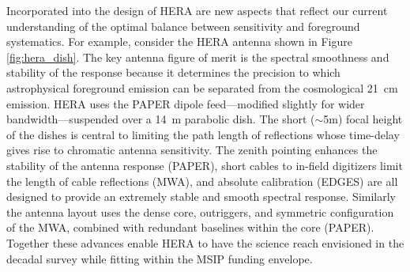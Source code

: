 \documentclass[preprint]{aastex}
\begin{document}
Incorporated into the design of HERA are new aspects that reflect our current understanding of the optimal balance between sensitivity and foreground systematics.  
For example, consider the HERA antenna shown in Figure \ref{fig:hera_dish}. The key antenna figure of merit is the spectral smoothness and stability of the response because it determines the precision to which astrophysical foreground emission can be separated from the cosmological 21~cm emission. HERA uses the PAPER dipole feed---modified slightly for wider bandwidth---suspended over a 14~m parabolic dish. The short ($\sim$5m) focal height of the dishes is central to limiting the path length of reflections whose time-delay gives rise to chromatic antenna sensitivity. The zenith pointing enhances the stability of the antenna response (PAPER), short cables to in-field digitizers limit the length of cable reflections (MWA), and absolute calibration (EDGES) are all designed to provide an extremely stable and smooth spectral response. Similarly the antenna layout uses the dense core, outriggers, and symmetric configuration of the MWA, combined with redundant baselines within the core (PAPER). Together these advances enable HERA to have the science reach envisioned in the decadal survey while fitting within the MSIP funding envelope.


\end{document}
